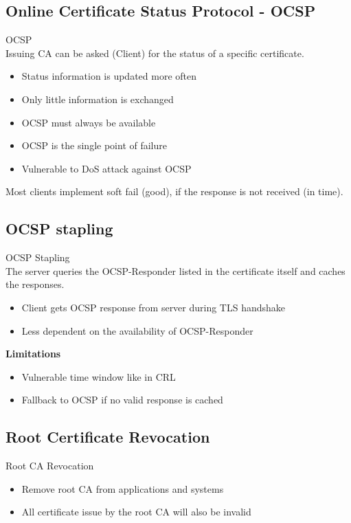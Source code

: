 \subsection{Online Certificate Status Protocol - OCSP}

\begin{definition}{OCSP}\\
    Issuing CA can be asked (Client) for the status of a specific certificate.
    \begin{itemize}
        \item Status information is updated more often
        \item Only little information is exchanged
        \item OCSP must always be available
        \item OCSP is the single point of failure
        \item Vulnerable to DoS attack against OCSP
    \end{itemize}
    
    Most clients implement soft fail (good), if the response is not received (in time).
\end{definition}


\subsection{OCSP stapling}

\begin{concept}{OCSP Stapling}\\
    The server queries the OCSP-Responder listed in the certificate itself and caches the responses.
    \begin{itemize}
        \item Client gets OCSP response from server during TLS handshake
        \item Less dependent on the availability of OCSP-Responder
    \end{itemize}
    
    \textbf{Limitations}
    \begin{itemize}
        \item Vulnerable time window like in CRL
        \item Fallback to OCSP if no valid response is cached
    \end{itemize}
\end{concept}


\subsection{Root Certificate Revocation}

\begin{concept}{Root CA Revocation}\\
    \begin{itemize}
        \item Remove root CA from applications and systems
        \item All certificate issue by the root CA will also be invalid
    \end{itemize}
\end{concept}